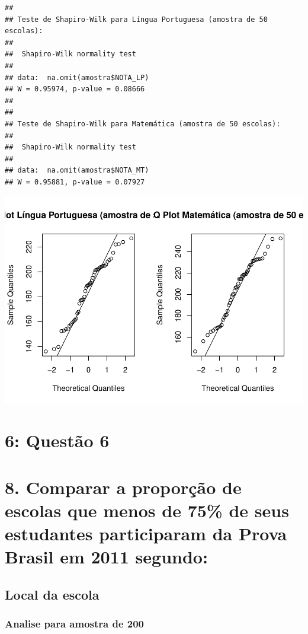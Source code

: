 \documentclass[
]{article}
\begin{document}
{\begin{verbatim}
## 
## Teste de Shapiro-Wilk para Língua Portuguesa (amostra de 50 escolas):
## 
##  Shapiro-Wilk normality test
## 
## data:  na.omit(amostra$NOTA_LP)
## W = 0.95974, p-value = 0.08666
## 
## 
## Teste de Shapiro-Wilk para Matemática (amostra de 50 escolas):
## 
##  Shapiro-Wilk normality test
## 
## data:  na.omit(amostra$NOTA_MT)
## W = 0.95881, p-value = 0.07927
\end{verbatim}

\includegraphics{Analises_files/figure-latex/unnamed-chunk-5-1.pdf}

\section{6: Questão 6}\label{questuxe3o-6}

\section{8. Comparar a proporção de escolas que menos de 75\% de seus
estudantes participaram da Prova Brasil em 2011
segundo:}\label{comparar-a-proporuxe7uxe3o-de-escolas-que-menos-de-75-de-seus-estudantes-participaram-da-prova-brasil-em-2011-segundo}

\subsection{Local da escola}\label{local-da-escola}

\subsubsection{Analise para amostra de
200}\label{analise-para-amostra-de-200}

}
\end{document}
